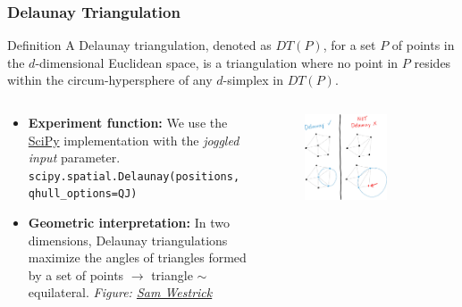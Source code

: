\documentclass[10pt, aspectratio = 169]{beamer}
\begin{document}
\begin{frame}
    \frametitle{Delaunay Triangulation}
    \small
    \begin{block}{Definition}
        A Delaunay triangulation, denoted as $DT(P)$, for a set $P$ of points 
        in the $d$-dimensional Euclidean space, is a triangulation where no 
        point in $P$ resides within the circum-hypersphere of any $d$-simplex 
        in $DT(P)$.
        
    \end{block}
    \begin{columns}
        \begin{column}{0.6\textwidth}
            \begin{itemize}
                \item  \textbf{Experiment function:}
            We use the \href{https://docs.scipy.org/doc/scipy/reference/generated/scipy.spatial.Delaunay.html}{SciPy}
            implementation with the \emph{joggled input} parameter.
            {\scriptsize
            \texttt{scipy.spatial.Delaunay(positions, qhull\_options=QJ)}
            }\\


            \item \textbf{Geometric interpretation:}
            In  two dimensions, Delaunay triangulations maximize the angles of triangles 
            formed by a set of points $\rightarrow$ triangle $\sim$ equilateral.
            \emph{Figure: \href{https://shwestrick.github.io/2021/12/18/delaunay-viz.html}{Sam Westrick}}
        \end{itemize}

        \end{column}
        \begin{column}{0.4\textwidth}
            \begin{figure}
                \includegraphics[width=0.7\textwidth]{figures/delaunay-not-delaunay.png}
                
            \end{figure}
        \end{column}
    \end{columns}
\end{frame}
\end{document}

